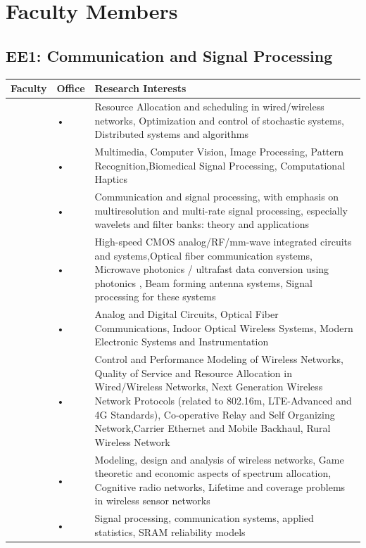 \documentclass[openany]{book} %
\begin{document}
\chapter{Faculty Members}
\section{EE1: Communication and Signal Processing}
\begin{tabular}{p{3.5cm} p{3.5cm}p{9cm}}
\hline 
\hline 
Faculty  & Office  & Research Interests \\ 
\hline

\href{https://www.ee.iitb.ac.in/wiki/faculty/chaporkar}{\color{blue}{Prof. Prasanna Chaporkar }} & • & Resource Allocation and scheduling in wired/wireless networks, Optimization and control of stochastic systems, Distributed systems and algorithms \\ 
\hline 
\href{https://www.ee.iitb.ac.in/~sc/}{\color{blue}{Prof. Subhasis Chaudhuri}} & • & Multimedia, Computer Vision, Image Processing, Pattern Recognition,Biomedical Signal Processing, Computational Haptics \\ 
\hline 
\href{https://www.ee.iitb.ac.in/wiki/faculty/vmgadre}{\color{blue}{Prof. Vikram M. Gadre }}& • & Communication and signal processing, with emphasis on multiresolution
and multi-rate signal processing, especially wavelets and filter banks:
theory and applications \\ 
\hline 
\href{https://www.ee.iitb.ac.in/wiki/faculty/shalabh}{\color{blue}{Prof. Shalabh Gupta}} & • & High-speed CMOS analog/RF/mm-wave integrated circuits and systems,Optical fiber communication systems, Microwave photonics / ultrafast data  conversion using photonics , Beam forming antenna systems, Signal processing for these systems \\ 
\hline 
\href{https://www.ee.iitb.ac.in/wiki/faculty/jjohn}{\color{blue}{Prof. Joseph John}} & • & Analog and Digital Circuits, Optical Fiber Communications, Indoor Optical Wireless Systems, Modern Electronic Systems and Instrumentation \\ 
\hline 
\href{http://www.iitb.ac.in/en/employee/prof-abhay-karandikar}{\color{blue}{Prof. Abhay Karandikar }}& • & Control and Performance Modeling of Wireless Networks, Quality of Service and Resource Allocation in Wired/Wireless Networks, Next Generation Wireless Network Protocols (related to 802.16m, LTE-Advanced and 4G Standards), Co-operative Relay and Self Organizing Network,Carrier Ethernet and Mobile Backhaul, Rural Wireless Network \\ 
\hline 
\href{https://www.ee.iitb.ac.in/~gskasbekar/}{\color{blue}{Prof. Gaurav S. Kasbekar}}& • & Modeling, design and analysis of wireless networks, Game theoretic and economic aspects of spectrum allocation, Cognitive radio networks,
Lifetime and coverage problems in wireless sensor networks \\ 
\hline 
\href{https://www.ee.iitb.ac.in/~animesh/}{\color{blue}{Prof. Animesh Kumar }} & • & Signal processing, communication systems, applied statistics, SRAM reliability models \\ 
\hline 
\end{tabular} 
\end{document}
